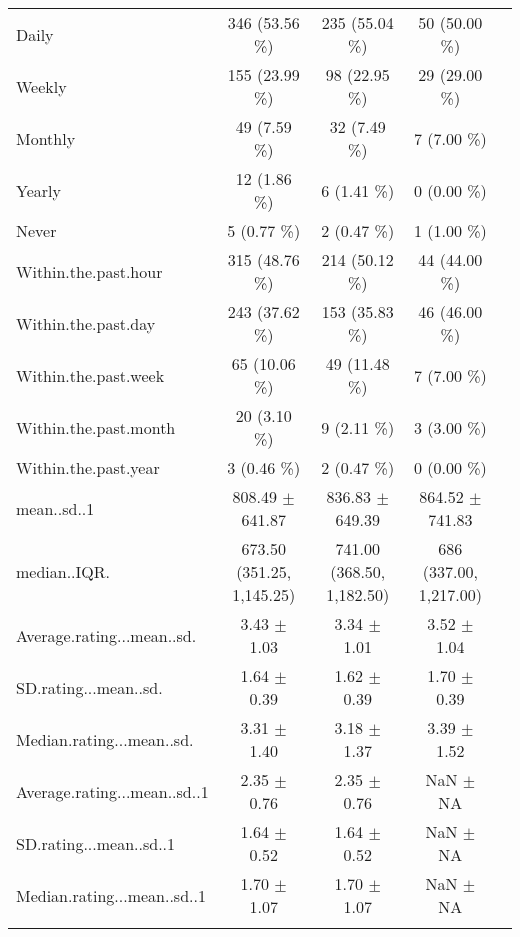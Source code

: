 \begin{table}[!htbp]
\begin{tabular}{@{\extracolsep{5pt}} lcccc}
Daily & 346 (53.56 \%) & 235 (55.04 \%) & 50 (50.00 \%) \\ 
Weekly & 155 (23.99 \%) & 98 (22.95 \%) & 29 (29.00 \%) \\ 
Monthly & 49 (7.59 \%) & 32 (7.49 \%) & 7 (7.00 \%) \\ 
Yearly & 12 (1.86 \%) & 6 (1.41 \%) & 0 (0.00 \%) \\ 
Never & 5 (0.77 \%) & 2 (0.47 \%) & 1 (1.00 \%) \\ 
Within.the.past.hour & 315 (48.76 \%) & 214 (50.12 \%) & 44 (44.00 \%) \\ 
Within.the.past.day & 243 (37.62 \%) & 153 (35.83 \%) & 46 (46.00 \%) \\ 
Within.the.past.week & 65 (10.06 \%) & 49 (11.48 \%) & 7 (7.00 \%) \\ 
Within.the.past.month & 20 (3.10 \%) & 9 (2.11 \%) & 3 (3.00 \%) \\ 
Within.the.past.year & 3 (0.46 \%) & 2 (0.47 \%) & 0 (0.00 \%) \\ 
mean..sd..1 & 808.49 $\pm$ 641.87 & 836.83 $\pm$ 649.39 & 864.52 $\pm$ 741.83 \\ 
median..IQR. & 673.50 (351.25, 1,145.25) & 741.00 (368.50, 1,182.50) & 686 (337.00, 1,217.00) \\ 
Average.rating...mean..sd. & 3.43 $\pm$ 1.03 & 3.34 $\pm$ 1.01 & 3.52 $\pm$ 1.04 \\ 
SD.rating...mean..sd. & 1.64 $\pm$ 0.39 & 1.62 $\pm$ 0.39 & 1.70 $\pm$ 0.39 \\ 
Median.rating...mean..sd. & 3.31 $\pm$ 1.40 & 3.18 $\pm$ 1.37 & 3.39 $\pm$ 1.52 \\ 
Average.rating...mean..sd..1 & 2.35 $\pm$ 0.76 & 2.35 $\pm$ 0.76 & NaN $\pm$  NA \\ 
SD.rating...mean..sd..1 & 1.64 $\pm$ 0.52 & 1.64 $\pm$ 0.52 & NaN $\pm$  NA \\ 
Median.rating...mean..sd..1 & 1.70 $\pm$ 1.07 & 1.70 $\pm$ 1.07 & NaN $\pm$  NA \\ 
\hline \\[-1.8ex] 
\end{tabular} 
\end{table} 
